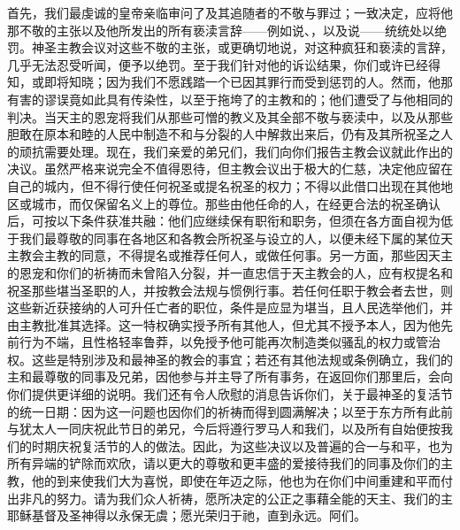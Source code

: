 首先，我们最虔诚的皇帝亲临审问了及其追随者的不敬与罪过；一致决定，应将他那不敬的主张以及他所发出的所有亵渎言辞——例如说、，以及说——统统处以绝罚。神圣主教会议对这些不敬的主张，或更确切地说，对这种疯狂和亵渎的言辞，几乎无法忍受听闻，便予以绝罚。至于我们针对他的诉讼结果，你们或许已经得知，或即将知晓；因为我们不愿践踏一个已因其罪行而受到惩罚的人。然而，他那有害的谬误竟如此具有传染性，以至于拖垮了的主教和的；他们遭受了与他相同的判决。当天主的恩宠将我们从那些可憎的教义及其全部不敬与亵渎中，以及从那些胆敢在原本和睦的人民中制造不和与分裂的人中解救出来后，仍有及其所祝圣之人的顽抗需要处理。现在，我们亲爱的弟兄们，我们向你们报告主教会议就此作出的决议。虽然严格来说完全不值得恩待，但主教会议出于极大的仁慈，决定他应留在自己的城内，但不得行使任何祝圣或提名祝圣的权力；不得以此借口出现在其他地区或城市，而仅保留名义上的尊位。那些由他任命的人，在经更合法的祝圣确认后，可按以下条件获准共融：他们应继续保有职衔和职务，但须在各方面自视为低于我们最尊敬的同事在各地区和各教会所祝圣与设立的人，以便未经下属的某位天主教会主教的同意，不得提名或推荐任何人，或做任何事。另一方面，那些因天主的恩宠和你们的祈祷而未曾陷入分裂，并一直忠信于天主教会的人，应有权提名和祝圣那些堪当圣职的人，并按教会法规与惯例行事。若任何任职于教会者去世，则这些新近获接纳的人可升任亡者的职位，条件是应显为堪当，且人民选举他们，并由主教批准其选择。这一特权确实授予所有其他人，但尤其不授予本人，因为他先前行为不端，且性格轻率鲁莽，以免授予他可能再次制造类似骚乱的权力或管治权。这些是特别涉及和最神圣的教会的事宜；若还有其他法规或条例确立，我们的主和最尊敬的同事及兄弟，因他参与并主导了所有事务，在返回你们那里后，会向你们提供更详细的说明。我们还有令人欣慰的消息告诉你们，关于最神圣的复活节的统一日期：因为这一问题也因你们的祈祷而得到圆满解决；以至于东方所有此前与犹太人一同庆祝此节日的弟兄，今后将遵行罗马人和我们，以及所有自始便按我们的时期庆祝复活节的人的做法。因此，为这些决议以及普遍的合一与和平，也为所有异端的铲除而欢欣，请以更大的尊敬和更丰盛的爱接待我们的同事及你们的主教，他的到来使我们大为喜悦，即使在年迈之际，他也为在你们中间重建和平而付出非凡的努力。请为我们众人祈祷，愿所决定的公正之事藉全能的天主、我们的主耶稣基督及圣神得以永保无虞；愿光荣归于祂，直到永远。阿们。\par

